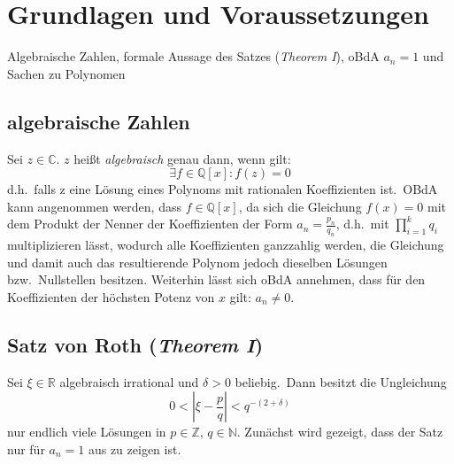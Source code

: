 \documentclass[11pt]{article}
\begin{document}
    \section{Grundlagen und Voraussetzungen}
    \label{sec:basics}
        Algebraische Zahlen, formale Aussage des Satzes (\emph{Theorem I}), oBdA $a_n = 1$ und Sachen zu Polynomen
        
        \subsection{algebraische Zahlen}
        \label{subsec:algebraic-numbers}
            \textrm{Sei $z \in \mathbb{C}$. $z$ heißt \emph{algebraisch} genau dann, wenn gilt:}
            \begin{equation}
                \exists f \in \mathbb{Q}[x] : f(z) = 0 \label{eq:def-algebraic}
            \end{equation}
            \textrm{d.h.\ falls z eine Lösung eines Polynoms mit rationalen Koeffizienten ist.\ OBdA kann angenommen
            werden, dass $f \in \mathbb{Q}[x]$, da sich die Gleichung $f(x) = 0$ mit dem Produkt der Nenner der
            Koeffizienten der Form $a_n = \frac{p_n}{q_n}$, d.h.\ mit $\prod_{i=1}^k q_i$ multiplizieren lässt, wodurch
            alle Koeffizienten ganzzahlig werden, die Gleichung und damit auch das resultierende Polynom jedoch dieselben
            Lösungen bzw.\ Nullstellen besitzen.
            \newline
            Weiterhin lässt sich oBdA annehmen, dass für den Koeffizienten der höchsten Potenz von $x$ gilt: $a_n \neq 0$.}
        
        \subsection{Satz von Roth (\emph{Theorem I})}
        \label{subsec:th1}
            Sei $\xi \in \mathbb{R}$ algebraisch irrational und $\delta > 0$ beliebig.\ Dann besitzt die Ungleichung
            \begin{equation}
                0 < | \xi - \frac{p}{q} | < q^{-(2+\delta)} \label{eq:svr}
            \end{equation}
            \textrm{nur endlich viele Lösungen in $p \in \mathbb{Z}$, $q \in \mathbb{N}$.
            \newline \newline
            Zunächst wird gezeigt, dass der Satz nur für $a_n = 1$ aus  zu zeigen ist.}
        
\end{document}
